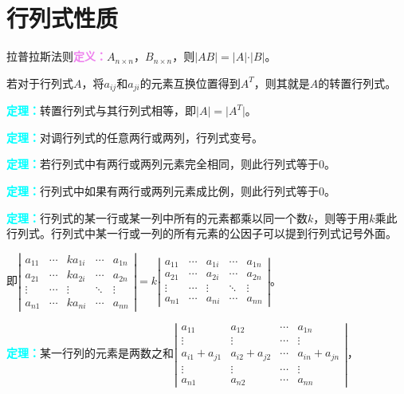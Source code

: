 \documentclass[UTF8, 12pt]{ctexart}
\begin{document}
\section{行列式性质}

拉普拉斯法则\textcolor{violet}{\textbf{定义：}}$A_{n\times n}$，$B_{n\times n}$，则$\vert AB\vert=\vert A\vert\cdot\vert B\vert$。

若对于行列式$A$，将$a_{ij}$和$a_{ji}$的元素互换位置得到$A^T$，则其就是$A$的转置行列式。

\textcolor{aqua}{\textbf{定理：}}转置行列式与其行列式相等，即$\vert A\vert=\vert A^T\vert$。

\textcolor{aqua}{\textbf{定理：}}对调行列式的任意两行或两列，行列式变号。

\textcolor{aqua}{\textbf{定理：}}若行列式中有两行或两列元素完全相同，则此行列式等于0。

\textcolor{aqua}{\textbf{定理：}}行列式中如果有两行或两列元素成比例，则此行列式等于0。

\textcolor{aqua}{\textbf{定理：}}行列式的某一行或某一列中所有的元素都乘以同一个数$k$，则等于用$k$乘此行列式。行列式中某一行或一列的所有元素的公因子可以提到行列式记号外面。

即$
\left|\begin{array}{ccccc} 
    a_{11} & \cdots & ka_{1i} & \cdots & a_{1n} \\
    a_{21} & \cdots & ka_{2i} & \cdots & a_{2n} \\
    \vdots & \cdots & \vdots & \ddots & \vdots \\
    a_{n1} & \cdots & ka_{ni} & \cdots & a_{nn}
\end{array}\right| 
=k\left|\begin{array}{ccccc} 
    a_{11} & \cdots & a_{1i} & \cdots & a_{1n} \\
    a_{21} & \cdots & a_{2i} & \cdots & a_{2n} \\
    \vdots & \cdots & \vdots & \ddots & \vdots \\
    a_{n1} & \cdots & a_{ni} & \cdots & a_{nn}
\end{array}\right|$。

\textcolor{aqua}{\textbf{定理：}}某一行列的元素是两数之和$
\left|\begin{array}{cccc} 
    a_{11} & a_{12} & \cdots & a_{1n} \\
    \vdots & \vdots & \cdots & \vdots \\
    a_{i1}+a_{j1} & a_{i2}+a_{j2} & \cdots & a_{in}+a_{jn} \\
    \vdots & \vdots & \cdots & \vdots \\
    a_{n1} & a_{n2} & \cdots & a_{nn}
\end{array}\right| 
$，
\end{document}
